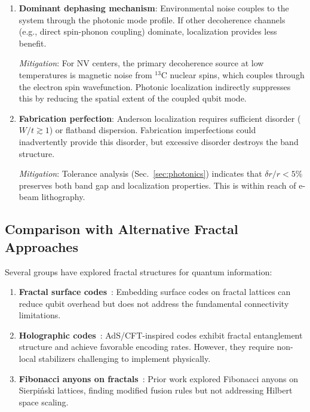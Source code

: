 \begin{enumerate}
\item \textbf{Dominant dephasing mechanism}: Environmental noise couples to the system through the photonic mode profile. If other decoherence channels (e.g., direct spin-phonon coupling) dominate, localization provides less benefit.

\textit{Mitigation}: For NV centers, the primary decoherence source at low temperatures is magnetic noise from $^{13}$C nuclear spins, which couples through the electron spin wavefunction. Photonic localization indirectly suppresses this by reducing the spatial extent of the coupled qubit mode.

\item \textbf{Fabrication perfection}: Anderson localization requires sufficient disorder ($W / t \gtrsim 1$) or flatband dispersion. Fabrication imperfections could inadvertently provide this disorder, but excessive disorder destroys the band structure.

\textit{Mitigation}: Tolerance analysis (Sec.~\ref{sec:photonics}) indicates that $\delta r / r < 5\%$ preserves both band gap and localization properties. This is within reach of e-beam lithography.
\end{enumerate}

\subsection{Comparison with Alternative Fractal Approaches}

Several groups have explored fractal structures for quantum information:

\begin{enumerate}
\item \textbf{Fractal surface codes}~\cite{Bravyi2013}: Embedding surface codes on fractal lattices can reduce qubit overhead but does not address the fundamental connectivity limitations.

\item \textbf{Holographic codes}~\cite{Pastawski2015}: AdS/CFT-inspired codes exhibit fractal entanglement structure and achieve favorable encoding rates. However, they require non-local stabilizers challenging to implement physically.

\item \textbf{Fibonacci anyons on fractals}~\cite{Trebst2008}: Prior work explored Fibonacci anyons on Sierpi\'{n}ski lattices, finding modified fusion rules but not addressing Hilbert space scaling.
\end{enumerate}

